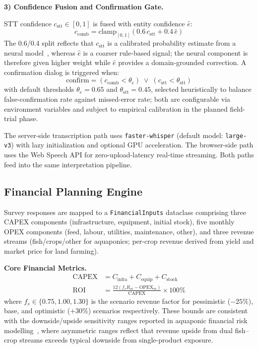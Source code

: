 \documentclass[conference]{IEEEtran}
\begin{document}
\medskip
\noindent\textbf{3) Confidence Fusion and Confirmation Gate.}

\noindent STT confidence $c_{\mathrm{stt}} \in [0,1]$ is fused with
entity confidence $\hat{e}$:
\begin{equation}
  c_{\mathrm{comb}} =
    \mathrm{clamp}_{[0,1]}\!\left(0.6\,c_{\mathrm{stt}} + 0.4\,\hat{e}\right)
  \label{eq:fusion}
\end{equation}
The 0.6/0.4 split reflects that $c_{\mathrm{stt}}$ is a calibrated
probability estimate from a neural model~\cite{ref10}, whereas
$\hat{e}$ is a coarser rule-based signal; the neural component is
therefore given higher weight while $\hat{e}$ provides a
domain-grounded correction.
A confirmation dialog is triggered when:
\begin{equation}
  \mathrm{confirm} =
    (c_{\mathrm{comb}} < \theta_{e}) \;\lor\;
    (c_{\mathrm{stt}} < \theta_{\mathrm{stt}})
  \label{eq:confirm}
\end{equation}
with default thresholds $\theta_{e}=0.65$ and
$\theta_{\mathrm{stt}}=0.45$, selected heuristically to balance
false-confirmation rate against missed-error rate; both are
configurable via environment variables and subject to empirical
calibration in the planned field-trial phase.

The server-side transcription path uses \texttt{faster-whisper} (default
model: \texttt{large-v3}) with lazy initialization and optional
GPU acceleration. The browser-side path uses the Web Speech API
for zero-upload-latency real-time streaming. Both paths feed into
the same interpretation pipeline.

\subsection{Financial Planning Engine}

Survey responses are mapped to a \texttt{FinancialInputs} dataclass
comprising three CAPEX components (infrastructure, equipment, initial
stock), five monthly OPEX components (feed, labour, utilities,
maintenance, other), and three revenue streams (fish/crops/other for
aquaponics; per-crop revenue derived from yield and market price for
land farming).

\medskip
\noindent\textbf{Core Financial Metrics.}
\begin{align}
  \mathrm{CAPEX} &= C_{\mathrm{infra}} + C_{\mathrm{equip}}
                    + C_{\mathrm{stock}} \label{eq:capex}\\
  \mathrm{ROI}   &= \frac{12(f_s R_m - \mathrm{OPEX}_m)}
                          {\mathrm{CAPEX}} \times 100\%
                    \label{eq:roi}
\end{align}
where $f_s \in \{0.75, 1.00, 1.30\}$ is the scenario revenue factor
for pessimistic ($-25\%$), base, and optimistic ($+30\%$) scenarios
respectively. These bounds are consistent with the downside/upside
sensitivity ranges reported in aquaponic financial risk
modelling~\cite{ref4}, where asymmetric ranges reflect that revenue
upside from dual fish--crop streams exceeds typical downside from
single-product exposure.
\end{document}
